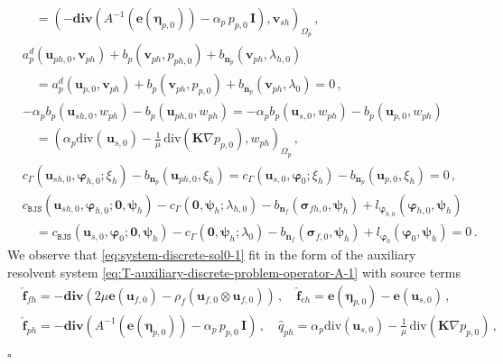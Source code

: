 \documentclass[11pt]{article}
\numberwithin{equation}{section}
\newcommand{\ds}{\displaystyle}
\newcommand{\bbeta}{{\boldsymbol\eta}}
\newcommand{\bsi}{{\boldsymbol\sigma}}
\newcommand{\bvarphi}{{\boldsymbol\varphi}}
\newcommand{\bpsi}{{\boldsymbol\psi}}
\newcommand{\bv}{{\mathbf{v}}}
\newcommand{\f}{\mathbf{f}}
\newcommand{\bu}{\mathbf{u}}
\newcommand{\bn}{{\mathbf{n}}}
\newcommand{\be}{{\mathbf{e}}}
\newcommand{\0}{{\mathbf{0}}}
\def\bK{\mathbf{K}}
\def\bI{\mathbf{I}}
\newcommand{\bL}{\mathbf{L}}
\def\BJS{\mathtt{BJS}}
\def\bdiv{\mathbf{div}}
\def\div{\mathrm{div}}
\def\wh{\widehat}
\newenvironment{proof}{\noindent{\it Proof.}}{\hfill$\square$}
\numberwithin{equation}{section}
\begin{document}
\begin{proof}
\begin{subequations}
\begin{align}
&\ds \quad = (- \bdiv(A^{-1}(\be(\bbeta_{p,0})) - \alpha_p\,p_{p,0}\,\bI),\bv_{sh})_{\Omega_p}\,, \label{eq:semi-discrete-weak-formulation-1e} \\[1ex] 
& \ds a^d_p(\bu_{ph,0},\bv_{ph}) + b_p(\bv_{ph},p_{ph,0}) + b_{\bn_p}(\bv_{ph},\lambda_{h,0}) \nonumber\\[1ex] 
& \ds \quad = a^d_p(\bu_{p,0},\bv_{ph}) + b_p(\bv_{ph},p_{p,0}) + b_{\bn_p}(\bv_{ph},\lambda_{0}) = 0\,, \label{eq:semi-discrete-weak-formulation-1f} \\[1ex] 
& \ds - \alpha_p b_p(\bu_{sh,0},w_{ph})  - b_p(\bu_{ph,0},w_{ph}) =
- \alpha_p b_p(\bu_{s,0},w_{ph})
- b_p(\bu_{p,0},w_{ph}) \nonumber \\[1ex] 
& \ds \quad = (\alpha_p \div (\,\bu_{s,0})
- \frac{1}{\mu}\,\div(\bK\nabla p_{p,0}),w_{ph})_{\Omega_p}\,, \label{eq:semi-discrete-weak-formulation-1g} \\[1ex] 
& \ds c_{\Gamma}(\bu_{sh,0},\bvarphi_{h,0};\xi_h) - b_{\bn_p}(\bu_{ph,0},\xi_h) = c_{\Gamma}(\bu_{s,0},\bvarphi_{0};\xi_h) - b_{\bn_p}(\bu_{p,0},\xi_h) = 0\,, \label{eq:semi-discrete-weak-formulation-1h} \\[1ex] 
& \ds c_{\BJS}(\bu_{sh,0},\bvarphi_{h,0};\0,\bpsi_h) - c_{\Gamma}(\0,\bpsi_h;\lambda_{h,0}) - b_{\bn_f}(\bsi_{fh,0},\bpsi_h) +l_{\bvarphi_{h,0}}(\bvarphi_{h,0},\bpsi_h) \nonumber \\[1ex]
& \ds \quad =  c_{\BJS}(\bu_{s,0},\bvarphi_{0};\0,\bpsi_h) - c_{\Gamma}(\0,\bpsi_h;\lambda_{0}) - b_{\bn_f}(\bsi_{f,0},\bpsi_h) +l_{\bvarphi_{0}}(\bvarphi_{0},\bpsi_h) = 0\,. \label{eq:semi-discrete-weak-formulation-1i} 
\end{align}
\end{subequations}
%
We observe that \eqref{eq:system-discrete-sol0-1} fit in the form of the auxiliary resolvent system \eqref{eq:T-auxiliary-discrete-problem-operator-A-1} with source terms
%
\begin{align*}
& \wh{\f}_{fh} =-\bdiv(2\mu\be(\bu_{f,0}) - \rho_f(\bu_{f,0}\otimes \bu_{f,0})) \,,\quad \wh{\f}_{eh} =\be(\bbeta_{p,0}) - \be(\bu_{s,0}) \,, \\ \nonumber
& \wh{\f}_{ph} =- \bdiv(A^{-1}(\be(\bbeta_{p,0})) - \alpha_p\,p_{p,0}\,\bI)  \,,\quad \wh{q}_{ph} = \alpha_p \div (\bu_{s,0})
- \frac{1}{\mu}\,\div(\bK\nabla p_{p,0}) \,,
\end{align*}
%

\end{proof}
\end{document}
